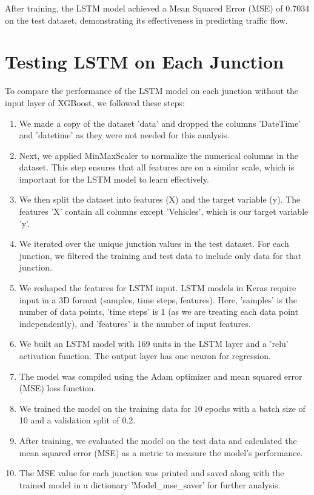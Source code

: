\documentclass{IEEEtran}
\begin{document}
After training, the LSTM model achieved a Mean Squared Error (MSE) of 0.7034 on the test dataset, demonstrating its effectiveness in predicting traffic flow.

\section{Testing LSTM on Each Junction}

To compare the performance of the LSTM model on each junction without the input layer of XGBoost, we followed these steps:

\begin{enumerate}
    \item We made a copy of the dataset 'data' and dropped the columns 'DateTime' and 'datetime' as they were not needed for this analysis.
    
    \item Next, we applied MinMaxScaler to normalize the numerical columns in the dataset. This step ensures that all features are on a similar scale, which is important for the LSTM model to learn effectively.
    
    \item We then split the dataset into features (X) and the target variable (y). The features 'X' contain all columns except 'Vehicles', which is our target variable 'y'.
    
    \item We iterated over the unique junction values in the test dataset. For each junction, we filtered the training and test data to include only data for that junction.
    
    \item We reshaped the features for LSTM input. LSTM models in Keras require input in a 3D format (samples, time steps, features). Here, 'samples' is the number of data points, 'time steps' is 1 (as we are treating each data point independently), and 'features' is the number of input features.
    
    \item We built an LSTM model with 169 units in the LSTM layer and a 'relu' activation function. The output layer has one neuron for regression.
    
    \item The model was compiled using the Adam optimizer and mean squared error (MSE) loss function.
    
    \item We trained the model on the training data for 10 epochs with a batch size of 10 and a validation split of 0.2.
    
    \item After training, we evaluated the model on the test data and calculated the mean squared error (MSE) as a metric to measure the model's performance.
    
    \item The MSE value for each junction was printed and saved along with the trained model in a dictionary 'Model_mse_saver' for further analysis.
\end{enumerate}
\end{document}

